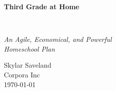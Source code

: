 



\clearpage
\vspace*{1.5in}
\begin{center}
  \begin{minipage}{\textwidth}
    \centering
    \Huge\bfseries
    \linespread{1.25}\selectfont
  Third Grade at Home
  \end{minipage}
  \\[3em]
  {\Large\itshape\linespread{1.3}\selectfont
  An Agile, Economical, and Powerful\\
  Homeschool Plan\par}
  \vfill
  {\large Skylar Saveland}
  \\[1em]
  {\large Corpora Inc}
  \\[1em]
  {\large \today}
\end{center}
\clearpage

